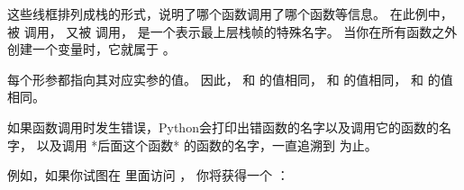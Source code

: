 
这些线框排列成栈的形式，说明了哪个函数调用了哪个函数等信息。
在此例中， 被  调用，
 又被  调用，  是一个表示最上层栈帧的特殊名字。
当你在所有函数之外创建一个变量时，它就属于 。


每个形参都指向其对应实参的值。
因此， 和  的值相同，  和  的值相同，  和  的值相同。


如果函数调用时发生错误，Python会打印出错函数的名字以及调用它的函数的名字，
以及调用 *后面这个函数* 的函数的名字，一直追溯到  为止。


例如，如果你试图在  里面访问  ，
你将获得一个  ：



